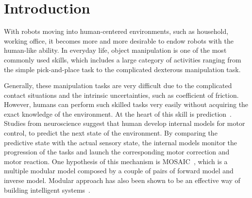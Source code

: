 \section{Introduction}
\label{intro}
With robots moving into human-centered environments, such as household, working office, it becomes more and more desirable to endow robots with the human-like ability. In everyday life, object manipulation is one of the most commonly used skills, which includes a large category of activities ranging from the simple pick-and-place task to the complicated dexterous manipulation task.


Generally, these manipulation tasks are very difficult due to the complicated contact situations and the intrinsic uncertainties, such as coefficient of friction. However, humans can perform such skilled tasks very easily without acquiring the exact knowledge of the environment. At the heart of this skill is prediction~\cite{flanagan2006control}. Studies from neuroscience suggest that human develop internal models for motor control, to predict the next state of the environment. By comparing the predictive state with the actual sensory state, the internal models monitor the progression of the tasks and launch the corresponding motor correction and motor reaction. One hypothesis of this mechanism is MOSAIC~\cite{haruno2001mosaic}, which is a multiple modular model composed by a couple of pairs of forward model and inverse model. Modular approach has also been shown to be an effective way of building intelligent systems~\cite{bryson2004modular,BrysonMcG12}. 


